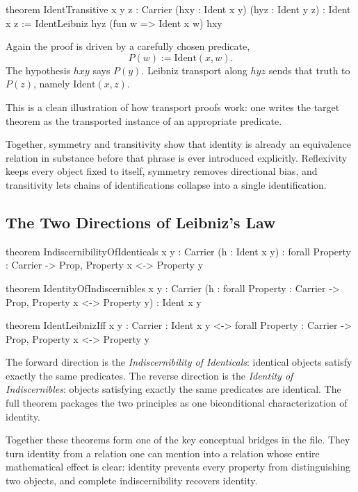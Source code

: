 \documentclass[11pt]{article}
\begin{document}
\begin{leanblock}
theorem IdentTransitive {x y z : Carrier}
    (hxy : Ident x y) (hyz : Ident y z) :
    Ident x z :=
  IdentLeibniz hyz (fun w => Ident x w) hxy
\end{leanblock}

Again the proof is driven by a carefully chosen predicate,
\[
P(w) := \mathrm{Ident}(x,w).
\]
The hypothesis \(hxy\) says \(P(y)\). Leibniz transport along \(hyz\) sends that truth to \(P(z)\), namely \(\mathrm{Ident}(x,z)\).

This is a clean illustration of how transport proofs work: one writes the target theorem as the transported instance of an appropriate predicate.

Together, symmetry and transitivity show that identity is already an equivalence relation in substance before that phrase is ever introduced explicitly. Reflexivity keeps every object fixed to itself, symmetry removes directional bias, and transitivity lets chains of identifications collapse into a single identification.

\subsection{The Two Directions of Leibniz's Law}

\begin{leanblock}
theorem IndiscernibilityOfIdenticals {x y : Carrier}
    (h : Ident x y) :
    forall Property : Carrier -> Prop, Property x <-> Property y

theorem IdentityOfIndiscernibles {x y : Carrier}
    (h : forall Property : Carrier -> Prop,
      Property x <-> Property y) : Ident x y

theorem IdentLeibnizIff {x y : Carrier} :
    Ident x y <-> forall Property : Carrier -> Prop,
      Property x <-> Property y
\end{leanblock}

The forward direction is the \emph{Indiscernibility of Identicals}: identical
objects satisfy exactly the same predicates. The reverse direction is the
\emph{Identity of Indiscernibles}: objects satisfying exactly the same
predicates are identical. The full theorem packages the two principles as one
biconditional characterization of identity.

Together these theorems form one of the key conceptual bridges in the file.
They turn identity from a relation one can mention into a relation whose entire
mathematical effect is clear: identity prevents every property from
distinguishing two objects, and complete indiscernibility recovers identity.
\end{document}
